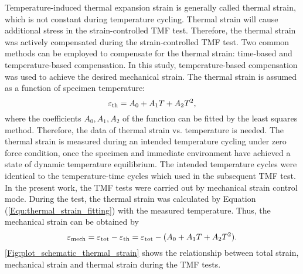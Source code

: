Temperature-induced thermal expansion strain is generally called thermal strain, which is not constant during temperature cycling. Thermal strain will cause additional stress in the strain-controlled TMF test. Therefore, the thermal strain was actively compensated during the strain-controlled TMF test. Two common methods can be employed to compensate for the thermal strain: time-based and temperature-based compensation. In this study, temperature-based compensation was used to achieve the desired mechanical strain. The thermal strain is assumed as a function of specimen temperature:
\begin{equation}
\varepsilon_{\rm{th}}=A_0+A_1 T+A_2 T^2,
\label{Equ:thermal_strain_fitting}
\end{equation}
where the coefficients $A_0, A_1, A_2$ of the function can be fitted by the least squares method. Therefore, the data of thermal strain vs. temperature is needed. The thermal strain is measured during an intended temperature cycling under zero force condition, once the specimen and immediate environment have achieved a state of dynamic temperature equilibrium. The intended temperature cycles were identical to the temperature-time cycles which used in the subsequent TMF test.
In the present work, the TMF tests were carried out by mechanical strain control mode.
During the test, the thermal strain was calculated by Equation (\ref{Equ:thermal_strain_fitting}) with the measured temperature. Thus, the mechanical strain can be obtained by
\begin{equation}
\varepsilon_{\rm{mech}}=\varepsilon_{\rm{tot}}-\varepsilon_{\rm{th}}=\varepsilon_{\rm{tot}}-(A_0+A_1 T+A_2 T^2).
\label{Equ:mech_strain}
\end{equation}
\ref{Fig:plot_schematic_thermal_strain} shows the relationship between total strain, mechanical strain and thermal strain during the TMF tests.

